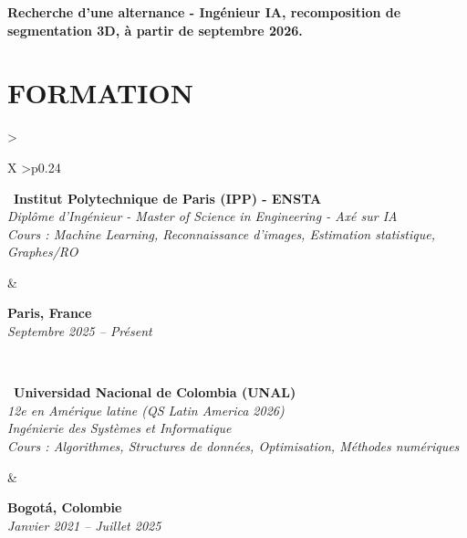\documentclass[letterpaper,10pt]{article}
\begin{document}
\textbf{Recherche d'une alternance - Ingénieur IA, recomposition de segmentation 3D, à partir de septembre 2026.} 


\vspace{-0.05cm}

\section{\textcolor{mydarkgreen}{\textbf{FORMATION}}}

\begin{tabularx}{\textwidth}{>{\raggedright\arraybackslash}X >{\raggedleft\arraybackslash}p{0.24\textwidth}}
  \begin{minipage}[t]{\linewidth}\raggedright
  \textbullet\ \textbf{Institut Polytechnique de Paris (IPP) - ENSTA}\\
  \textit{\footnotesize Diplôme d'Ingénieur - Master of Science in Engineering - Axé sur IA}\\
  \textit{\footnotesize Cours : Machine Learning, Reconnaissance d'images, Estimation statistique, Graphes/RO}
  \end{minipage}
  &
  \begin{minipage}[t]{\linewidth}\raggedleft
  \textbf{Paris, France}\\
  {\footnotesize\textit{Septembre 2025 -- Présent}}
  \end{minipage}
  \\
  \begin{minipage}[t]{\linewidth}
  \textbullet\ \textbf{Universidad Nacional de Colombia (UNAL)}\\
  \textit{\footnotesize 12e en Amérique latine (QS Latin America 2026)}\\
  \textit{\footnotesize Ingénierie des Systèmes et Informatique}\\
  \textit{\footnotesize Cours : Algorithmes, Structures de données, Optimisation, Méthodes numériques}
  \end{minipage}
  &
  \begin{minipage}[t]{\linewidth}\raggedleft
  \textbf{Bogotá, Colombie}\\
  {\footnotesize\textit{Janvier 2021 -- Juillet 2025}}
  \end{minipage}

\end{tabularx}
\end{document}
